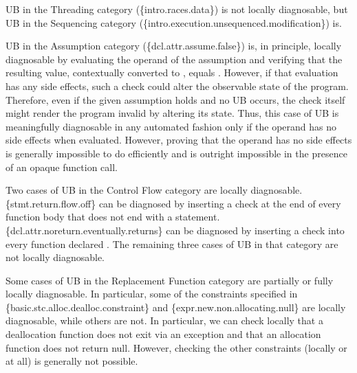 UB in the Threading category (\{intro.races.data\}) is not locally diagnosable, but UB in the Sequencing category (\{intro.execution.unsequenced.modification\}) is. 

UB in the Assumption category (\{dcl.attr.assume.false\}) is, in principle, locally diagnosable by evaluating the operand of the assumption and verifying that the resulting value, contextually converted to , equals . However, if that evaluation has any side effects, such a check could alter the observable state of the program. Therefore, even if the given assumption holds and no UB occurs, the check itself might render the program invalid by altering its state. Thus, this case of UB is  meaningfully diagnosable in any automated fashion only if the operand has no side effects when evaluated. However, proving that the operand has no side effects is generally impossible to do efficiently and is outright impossible in the presence of an opaque function call.

Two cases of UB in the Control Flow category are locally diagnosable. \{stmt.return.flow.off\} can be diagnosed by inserting a check at the end of every function body that does not end with a  statement. \{dcl.attr.noreturn.eventually.returns\} can be diagnosed by inserting a check into every function declared \tcode{[[noreturn]]}. The remaining three cases of UB in that category are not locally diagnosable.

Some cases of UB in the Replacement Function category are partially or fully locally diagnosable. In particular, some of the constraints specified in \{basic.stc.alloc.dealloc.constraint\} and \{expr.new.non.allocating.null\} are locally diagnosable, while others are not. In particular, we can check locally that a deallocation function does not exit via an exception and that an allocation function does not return null. However, checking the other constraints (locally or at all) is generally not possible.

